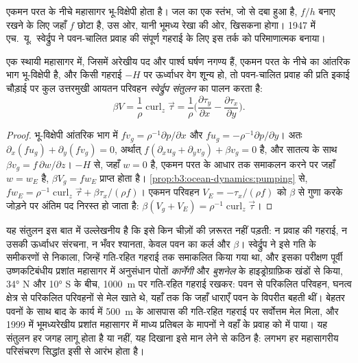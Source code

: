 एकमन परत के नीचे महासागर भू-विक्षेपी होता है। जल का एक स्तंभ, जो
 से दबा हुआ है,  $f/h$ बनाए रखने के लिए
जहाँ $f$ छोटा है, उस ओर, यानी भूमध्य रेखा की ओर, खिसकना होगा। 1947 में एच.~यू.~स्वेर्द्रुप
ने पवन-चालित प्रवाह की संपूर्ण गहराई के लिए इस तर्क को परिमाणात्मक बनाया।

\begin{theorem}[स्वेर्द्रुप संतुलन]\label{thm:b3:ocean-dynamics:sverdrup}
एक स्थायी महासागर में, जिसमें अरेखीय पद और पार्श्व घर्षण
नगण्य हैं, एकमन परत के नीचे का आंतरिक भाग भू-विक्षेपी है, और
किसी गहराई $-H$ पर ऊर्ध्वाधर वेग शून्य हो, तो
पवन-चालित प्रवाह की प्रति इकाई चौड़ाई पर कुल उत्तरमुखी आयतन परिवहन
\emph{स्वेर्द्रुप संतुलन} का पालन करता है:
\[
\beta V = \frac{1}{\rho}\operatorname{curl}_z\vec\tau
= \frac{1}{\rho}\Big(\frac{\partial\tau_y}{\partial x} -
\frac{\partial\tau_x}{\partial y}\Big) .
\]
\end{theorem}

\begin{proof}
भू-विक्षेपी आंतरिक भाग में $fv_g = \rho^{-1}\partial p/\partial x$ और
$fu_g = -\rho^{-1}\partial p/\partial y$। अतः $\partial_x(fu_g) +
\partial_y(fv_g) = 0$, अर्थात् $f(\partial_xu_g + \partial_yv_g) + \beta
v_g = 0$ है, और सातत्य के साथ $\beta v_g = f\,\partial w/\partial z$।
$-H$ से, जहाँ $w = 0$ है, एकमन परत के आधार तक समाकलन करने पर
जहाँ $w = w_E$ है, $\beta V_g = fw_E$ प्राप्त होता है।
\cref{prop:b3:ocean-dynamics:pumping} से, $fw_E = \rho^{-1}\operatorname{curl}_z
\vec\tau + \beta\tau_x/(\rho f)$। एकमन परिवहन $V_E =
-\tau_x/(\rho f)$ को $\beta$ से गुणा करके जोड़ने पर अंतिम पद निरस्त हो जाता है:
$\beta(V_g + V_E) = \rho^{-1}\operatorname{curl}_z\vec\tau$।
\end{proof}

यह संतुलन इस बात में उल्लेखनीय है कि इसे किन चीज़ों की ज़रूरत नहीं पड़ती: न प्रवाह की
गहराई, न उसकी ऊर्ध्वाधर संरचना, न भँवर श्यानता, केवल पवन का
कर्ल और $\beta$। स्वेर्द्रुप ने इसे गति के समीकरणों से निकाला, जिन्हें
गति-रहित गहराई तक समाकलित किया गया था, और इसका परीक्षण पूर्वी उष्णकटिबंधीय प्रशांत महासागर में
अनुसंधान पोतों \emph{कार्नेगी} और
\emph{बुशनेल} के हाइड्रोग्राफ़िक खंडों से किया, \ang{34} N और
\ang{10} S के बीच, \qty{1000}{m} पर गति-रहित गहराई रखकर: पवन से परिकलित परिवहन,
घनत्व क्षेत्र से परिकलित परिवहनों से मेल खाते थे, यहाँ तक कि जहाँ धाराएँ
पवन के विपरीत बहती थीं। बेहतर पवनों के साथ बाद के कार्य में
\qty{500}{m} के आसपास की गति-रहित गहराई पर सर्वोत्तम मेल मिला, और
1999 में भूमध्यरेखीय प्रशांत महासागर में माध्य प्रतिबल के मापनों ने वहाँ
के प्रवाह को  में पाया। यह संतुलन हर जगह लागू होता है या नहीं,
यह दिखाना इसे मान लेने से कठिन है: लगभग हर महासागरीय परिसंचरण सिद्धांत
इसी से आरंभ होता है।

